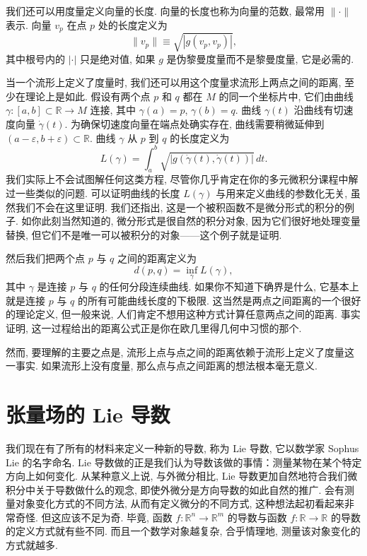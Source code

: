 我们还可以用度量定义向量的长度. 向量的长度也称为向量的范数, 最常用 $\lVert\cdot\rVert$ 表示. 向量 $v_p$ 在点 $p$ 处的长度定义为
\[
\lVert v_p\rVert\equiv\sqrt{\left|g(v_p,v_p)\right|},
\]
其中根号内的 $|\cdot|$ 只是绝对值, 如果 $g$ 是伪黎曼度量而不是黎曼度量, 它是必需的.

当一个流形上定义了度量时, 我们还可以用这个度量求流形上两点之间的距离, 至少在理论上是如此. 假设有两个点 $p$ 和 $q$ 都在 $M$ 的同一个坐标片中, 它们由曲线 $\gamma:[a,b]\subset\mathbb{R}\to M$ 连接, 其中 $\gamma(a)=p$, $\gamma(b)=q$. 曲线 $\gamma(t)$ 沿曲线有切速度向量 $\dot{\gamma}(t)$. 为确保切速度向量在端点处确实存在, 曲线需要稍微延伸到 $(a-\varepsilon,b+\varepsilon)\subset\mathbb{R}$. 曲线 $\gamma$ 从 $p$ 到 $q$ 的长度定义为
\[
L(\gamma)=\int_a^b\sqrt{\left|g\left(\dot{\gamma}(t),\dot{\gamma}(t)\right)\right|}\,dt.
\]
我们实际上不会试图解任何这类方程, 尽管你几乎肯定在你的多元微积分课程中解过一些类似的问题. 可以证明曲线的长度 $L(\gamma)$ 与用来定义曲线的参数化无关, 虽然我们不会在这里证明. 我们还指出, 这是一个被积函数不是微分形式的积分的例子. 如你此刻当然知道的, 微分形式是很自然的积分对象, 因为它们很好地处理变量替换, 但它们不是唯一可以被积分的对象——这个例子就是证明.

然后我们把两个点 $p$ 与 $q$ 之间的距离定义为
\[
d(p,q)=\inf_{\gamma}L(\gamma),
\]
其中 $\gamma$ 是连接 $p$ 与 $q$ 的任何分段连续曲线. 如果你不知道下确界是什么, 它基本上就是连接 $p$ 与 $q$ 的所有可能曲线长度的下极限. 这当然是两点之间距离的一个很好的理论定义, 但一般来说, 人们肯定不想用这种方式计算任意两点之间的距离. 事实证明, 这一过程给出的距离公式正是你在欧几里得几何中习惯的那个.

然而, 要理解的主要之点是, 流形上点与点之间的距离依赖于流形上定义了度量这一事实. 如果流形上没有度量, 那么点与点之间距离的想法根本毫无意义.

\section{张量场的 Lie 导数}\label{sec:A-7}

我们现在有了所有的材料来定义一种新的导数, 称为 Lie 导数, 它以数学家 Sophus Lie 的名字命名. Lie 导数做的正是我们认为导数该做的事情：测量某物在某个特定方向上如何变化. 从某种意义上说, 与外微分相比, Lie 导数更加自然地符合我们微积分中关于导数做什么的观念, 即使外微分是方向导数的如此自然的推广. 会有测量对象变化方式的不同方法, 从而有定义微分的不同方式, 这种想法起初看起来非常奇怪. 但这应该不足为奇. 毕竟, 函数 $f:\mathbb{R}^n\to\mathbb{R}^m$ 的导数与函数 $f:\mathbb{R}\to\mathbb{R}$ 的导数的定义方式就有些不同. 而且一个数学对象越复杂, 合乎情理地, 测量该对象变化的方式就越多.

